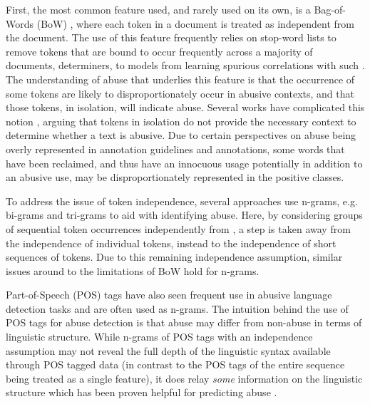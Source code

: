 First, the most common feature used, and rarely used on its own, is a Bag-of-Words (BoW) \citep{Fortuna:2018,Davidson:2017}, where each token in a document is treated as independent from  the document.  
The use of this feature frequently relies on  stop-word lists to remove tokens that are bound to occur frequently across a majority of documents,  determiners, to  models from learning spurious correlations with such .  
The understanding of abuse that underlies this feature is that the occurrence of some tokens are likely to disproportionately occur in abusive contexts, and that those tokens, in isolation, will indicate abuse.  
Several works have complicated this notion \citep[e.g.]{Waseem:2018,Davidson:2019}, arguing that tokens  in isolation do not provide the necessary context to determine whether a text is abusive.  
Due to certain perspectives on abuse being overly represented \citep{Waseem:2016} in annotation guidelines and annotations, some words that have been reclaimed, and thus have an innocuous usage potentially in addition to an abusive use, may be disproportionately represented in the positive classes.  
  
To address the issue of token independence, several approaches use n-grams, e.g. bi-grams \citep{Waseem:2016} and tri-grams \citep{Davidson:2017} to aid with identifying abuse.  
Here, by considering groups of sequential token occurrences independently from , a step is taken away from the independence of individual tokens, instead to the independence of short sequences of tokens.  
Due to this remaining independence assumption, similar issues around to the limitations of BoW hold for n-grams.  
  
Part-of-Speech (POS) tags have also seen frequent use in abusive language detection tasks \citep{Fortuna:2018} and are often used as n-grams.  
The intuition behind the use of POS tags for abuse detection is that abuse may differ from non-abuse in terms of linguistic structure.  
While n-grams of POS tags with an independence assumption may not reveal the full depth of the linguistic syntax available through POS tagged data (in contrast to the POS tags of the entire sequence being treated as a single feature), it does relay \textit{some} information on the linguistic structure which has been proven helpful for predicting abuse \citep{Fortuna:2018}.  
  
